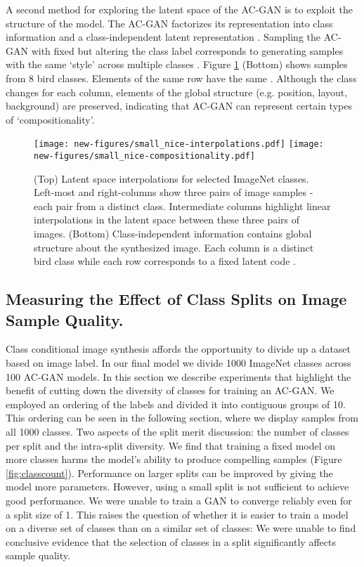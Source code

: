 \documentclass{article}
\begin{document}
A second method for exploring 
the latent space of the AC-GAN is to exploit the structure of the model.
The AC-GAN factorizes its representation into class information
and a class-independent latent representation .
Sampling the AC-GAN with  fixed but altering the class label
corresponds to 
generating samples with the same `style' across multiple classes \citep{SSVAE}.
Figure \ref{fig:interpolations} (Bottom) shows samples from 8 bird classes.
Elements of the same row have the same .
Although the class changes for each column, elements
of the global structure (e.g. position, layout, background) are preserved,
indicating that AC-GAN can represent certain types of `compositionality'. 

\begin{figure}[!h]
\texttt{[image: new-figures/small\_nice-interpolations.pdf]}
\texttt{[image: new-figures/small\_nice-compositionality.pdf]}
\centering
\caption{(Top) Latent space interpolations for selected ImageNet classes.
Left-most and right-columns show three pairs of image samples - each pair from a distinct class.
Intermediate columns highlight linear interpolations in the latent space between these three
pairs of images.
(Bottom) Class-independent information contains global structure about the synthesized image.
Each column is a distinct bird class while each row corresponds to a fixed latent code .
}
\label{fig:interpolations}
\end{figure}

\subsection{Measuring the Effect of Class Splits on Image Sample Quality.} \label{section:count}

Class conditional image synthesis affords the opportunity to divide up
a dataset based on image label.
In our final model we divide 1000 ImageNet classes across 100 AC-GAN models. In this section
we describe experiments that highlight the benefit of cutting down the diversity of classes for
training an AC-GAN.
We employed an ordering of the labels and divided it into contiguous groups of 10.
This ordering can be seen in the following section, where we display
samples from all 1000 classes.
Two aspects of the split merit discussion: the number of classes per split and
the intra-split diversity.
We find that training a fixed model on more classes harms
the model's ability to produce compelling samples
(Figure \ref{fig:classcount}).
Performance on larger splits can
be improved by giving the model more parameters.
However, using a small split is not sufficient to achieve good performance.
We were unable to train a GAN \citep{GANS} to converge reliably even for a split size of 1.
This raises the question of whether it is easier to train a model on a
diverse set of classes than on a similar set of classes:
We were unable to find conclusive evidence that the selection
of classes in a split significantly affects sample quality.
\end{document}
